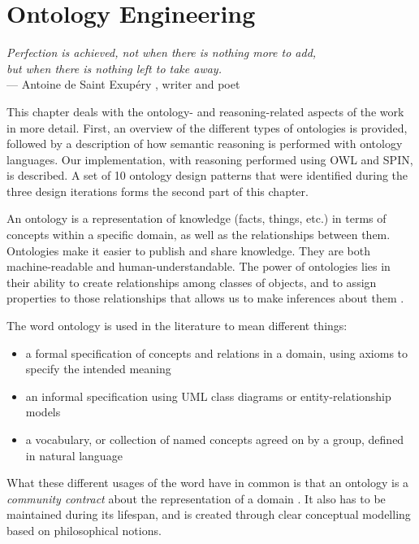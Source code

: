 \chapter{Ontology Engineering}
\label{OntologyEngineering}

\begin{flushright}{\slshape    
Perfection is achieved, not when there is nothing more to add, \\
but when there is nothing left to take away.} \\ \medskip
    ---  Antoine de Saint Exup\'ery \cite{InteractionDe}, writer and poet
\end{flushright}

This chapter deals with the ontology- and reasoning-related aspects of the work in more detail. First, an overview of the different types of ontologies is provided, followed by a description of how semantic reasoning is performed with ontology languages. Our implementation, with reasoning performed using \ac{OWL} and \ac{SPIN}, is described. A set of 10 ontology design patterns that were identified during the three design iterations forms the second part of this chapter.

An ontology is a representation of knowledge (facts, things, etc.) in terms of concepts within a specific domain, as well as the relationships between them. Ontologies make it easier to publish and share knowledge. They are both machine-readable and human-understandable. The power of ontologies lies in their ability to create relationships among classes of objects, and to assign properties to those relationships that allows us to make inferences about them \cite{Jepsen2009}.

The word ontology is used in the literature to mean different things:
\begin{itemize}
	\item a formal specification of concepts and relations in a domain, using axioms to specify the intended meaning
	\item an informal specification using UML class diagrams or entity-relationship models
	\item a vocabulary, or collection of named concepts agreed on by a group, defined in natural language
\end{itemize}

 What these different usages of the word have in common is that an ontology is a \emph{community contract}\label{CommunityContract} about the representation of a domain \cite{Hepp2007}. It also has to be maintained during its lifespan, and is created through clear conceptual modelling based on philosophical notions. 

